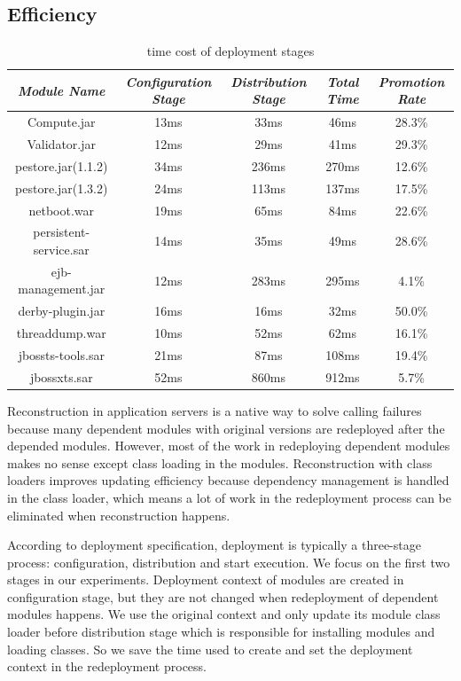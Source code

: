 \documentclass[conference]{IEEEtran}
\begin{document}
\subsection{Efficiency}


\begin{table}
\centering
\caption{time cost of deployment stages}
\label{tab:stage}
\begin{tabular}{|c|c|c|c|c|}
\hline
\emph{Module Name}	&	\emph{Configuration Stage}	&	\emph{Distribution Stage}	&	\emph{Total Time}	&	\emph{Promotion Rate}\\
\hline
\hline
Compute.jar		&	13ms			&	33ms			&	46ms			&	28.3\%\\
\hline
Validator.jar		&	12ms			&	29ms			&	41ms			&	29.3\%\\
\hline
pestore.jar(1.1.2)	&	34ms			&	236ms			&	270ms			&	12.6\%\\
\hline
pestore.jar(1.3.2)	&	24ms			&	113ms			&	137ms			&	17.5\%\\
\hline
netboot.war		&	19ms		 	&	65ms			&	84ms			&	22.6\%\\
\hline
persistent-service.sar 	& 	14ms 			&	35ms			&	49ms			&	28.6\%\\
\hline
ejb-management.jar	& 	12ms		 	&	283ms			&	295ms			&	4.1\%\\
\hline
derby-plugin.jar	&	16ms			&	16ms			&	32ms			&	50.0\%\\
\hline
threaddump.war		&	10ms			&	52ms			&	62ms			&	16.1\%\\
\hline
jbossts-tools.sar	&	21ms			&	87ms			&	108ms			&	19.4\%\\
\hline
jbossxts.sar		&	52ms			&	860ms			&	912ms			&	5.7\%\\
\hline
\end{tabular}
\end{table}


Reconstruction in application servers is a native way to solve calling failures because many dependent modules with original versions are redeployed after the depended modules.
However, most of the work in redeploying dependent modules makes no sense except class loading in the modules.
Reconstruction with class loaders improves updating efficiency because dependency management is handled in the class loader, which means a lot of work in the redeployment process can be eliminated when reconstruction happens.

According to deployment specification\cite{jsr88}, deployment is typically a three-stage process: configuration, distribution and start execution.
We focus on the first two stages in our experiments.
Deployment context of modules are created in configuration stage, but they are not changed when redeployment of dependent modules happens.
We use the original context and only update its module class loader before distribution stage which is responsible for installing modules and loading classes.
So we save the time used to create and set the deployment context in the redeployment process.
\end{document}
